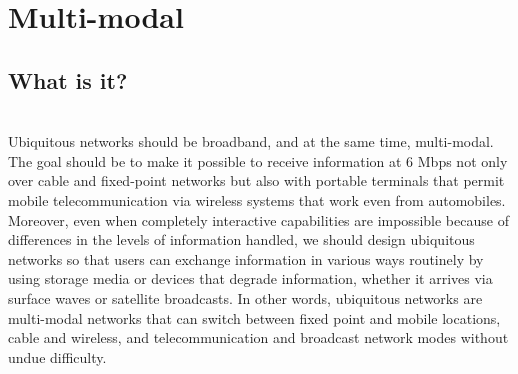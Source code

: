 \documentclass[12pt]{report}
\begin{document}
\section{Multi-modal}
\subsection{What is it?}\\
\hspace*{0.5in}Ubiquitous networks should be broadband, and at the same time, multi-modal. The goal should be to make it possible to receive information at 6 Mbps not only over cable and fixed-point networks but also with portable terminals that permit mobile telecommunication via wireless systems that work even from automobiles. Moreover, even when completely interactive capabilities are impossible because of differences in the levels of information handled, we should design ubiquitous networks so that users can exchange information in various ways routinely by using storage media or devices that degrade information, whether it arrives via surface waves or satellite broadcasts. In other words, ubiquitous networks are multi-modal networks that can switch between fixed point and mobile locations, cable and wireless, and telecommunication and broadcast network modes without undue difficulty.
\end{document}
